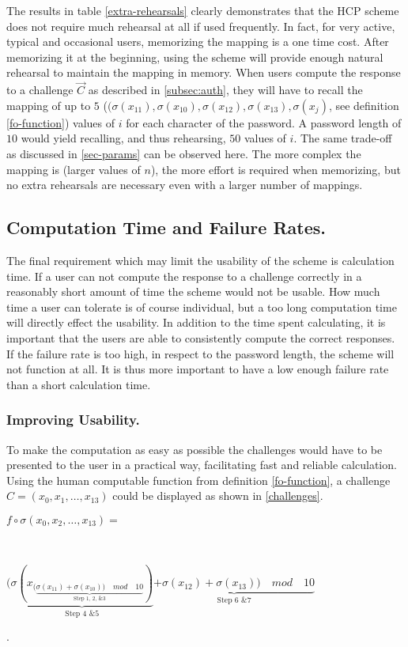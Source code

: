 \par The results in table \ref{extra-rehearsals} clearly demonstrates that the HCP scheme does not require much rehearsal at all if used frequently. In fact, for very active, typical and occasional users, memorizing the mapping is a one time cost. After memorizing it at the beginning, using the scheme will provide enough natural rehearsal to maintain the mapping in memory. 
When users compute the response to a challenge $\vec C$ as described in \autoref{subsec:auth}, they will have to recall the mapping of up to $5$ ($(\sigma(x_{11}), \sigma(x_{10}), \sigma(x_{12}), \sigma(x_{13}),\sigma(x_j)$, see definition \ref{fo-function}) values of $i$ for each character of the password. A password length of $10$ would yield recalling, and thus rehearsing, $50$ values of $i$. The same trade-off as discussed in \autoref{sec-params} can be observed here. The more complex the mapping is (larger values of $n$), the more effort is required when memorizing, but no extra rehearsals are necessary even with a larger number of mappings.

    \subsection{Computation Time and Failure Rates.}\label{computation-time}
The final requirement which may limit the usability of the scheme is calculation time. If a user can not compute the response to a challenge correctly in a reasonably short amount of time the scheme would not be usable. How much time a user can tolerate is of course individual, but a too long computation time will directly effect the usability. In addition to the time spent calculating, it is important that the users are able to consistently compute the correct responses. If the failure rate is too high, in respect to the password length, the scheme will not function at all. It is thus more important to have a low enough failure rate than a short calculation time.


\subsubsection{Improving Usability.}\label{improving-usab}

\par To make the computation as easy as possible the challenges would have to be presented to the user in a practical way, facilitating fast and reliable calculation. Using the human computable function from definition \ref{fo-function}, a challenge $C = (x_0, x_1,\dots, x_{13})$ could be displayed as shown in \autoref{challenges}. \\ 
\centerline{ $f\circ \sigma(x_0,x_2,\dots,x_{13}) =$} \\
\centerline{$\big(\underbrace{\sigma ( x_{ (\underbrace{\sigma(x_{11}) + \sigma(x_{10}) )\quad mod \quad 10}_\text{Step 1, 2, \& 3}} )}_\text{Step 4 \& 5} \underbrace{ +\sigma ( x_{12} ) + \sigma( x_{13} )\big)\quad mod \quad 10 }_\text{Step 6 \& 7}$ }. 

